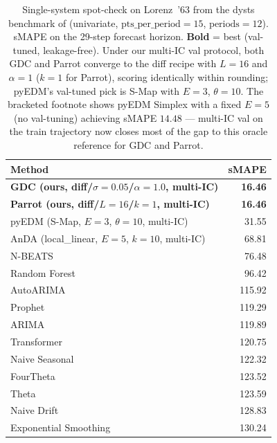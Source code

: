\begin{table}[t]
\centering
\caption{Single-system spot-check on Lorenz~'63 from the dysts benchmark of \citet{gilpin2021chaos} (univariate, $\mathrm{pts\_per\_period}=15$, $\mathrm{periods}=12$). sMAPE on the 29-step forecast horizon. \textbf{Bold} = best (val-tuned, leakage-free). Under our multi-IC val protocol, both GDC and Parrot converge to the diff recipe with $L{=}16$ and $\alpha{=}1$ ($k{=}1$ for Parrot), scoring identically within rounding; pyEDM's val-tuned pick is S-Map with $E{=}3$, $\theta{=}10$. The bracketed footnote shows pyEDM Simplex with a fixed $E{=}5$ (no val-tuning) achieving sMAPE $14.48$ — multi-IC val on the train trajectory now closes most of the gap to this oracle reference for GDC and Parrot.}
\label{tab:dysts_lorenz}
\small
\begin{tabular}{l r}
\toprule
Method & sMAPE \\
\midrule
\textbf{GDC (ours, diff/$\sigma{=}0.05$/$\alpha{=}1.0$, multi-IC)} & \textbf{16.46} \\
\textbf{Parrot (ours, diff/$L{=}16$/$k{=}1$, multi-IC)} & \textbf{16.46} \\
pyEDM (S-Map, $E{=}3$, $\theta{=}10$, multi-IC) & 31.55 \\
AnDA (local\_linear, $E{=}5$, $k{=}10$, multi-IC) & 68.81 \\
N-BEATS                            &  76.48 \\
Random Forest                      &  96.42 \\
AutoARIMA                          & 115.92 \\
Prophet                            & 119.29 \\
ARIMA                              & 119.89 \\
Transformer                        & 120.75 \\
Naive Seasonal                     & 122.32 \\
FourTheta                          & 123.52 \\
Theta                              & 123.59 \\
Naive Drift                        & 128.83 \\
Exponential Smoothing              & 130.24 \\

\end{tabular}
\end{table}
